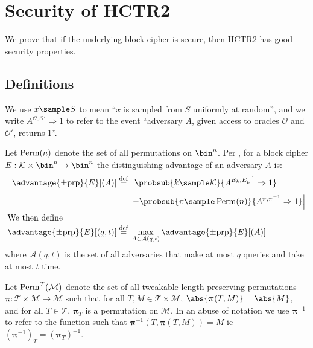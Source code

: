 \documentclass[hctr.tex]{subfiles}
\begin{document}
\section{Security of HCTR2}\label{security}
We prove that if the underlying block cipher is secure,
then HCTR2 has good security properties.
\subsection{Definitions}
We use \(x \sample S\) to mean ``\(x\) is sampled from \(S\)
uniformly at random'', and we write
\(A^{\mathcal{O}, \mathcal{O}'}\Rightarrow 1\) to refer
to the event ``adversary \(A\),
given access to oracles \(\mathcal{O}\) and \(\mathcal{O}'\),
returns 1''.

Let $\operatorname{Perm}(n)$ denote the set of all permutations on \(\bin^n\).
Per \cite{concrete}, for a block cipher 
\(E: \mathcal{K} \times \bin^n \rightarrow \bin^n\)
the distinguishing advantage of an adversary \(A\) is:
%
\begin{align*}
    \advantage{\pm \mathrm{prp}}{E}[(A)] \defeq
    {}&\left\lvert\probsub{k \sample \mathcal{K}}{A^{E_k,E_k^{-1}}\Rightarrow 1}\right.
    \\
    {}&\left. - \probsub{\pi \sample \Perm(n)}{A^{\pi,\pi^{-1}}\Rightarrow 1}\right\rvert
    \\
    \intertext{We then define}
    \advantage{\pm \mathrm{prp}}{E}[(q, t)] \defeq
    {}&\max_{A \in \mathcal{A}(q, t)} \advantage{\pm \mathrm{prp}}{E}[(A)]
\end{align*}
where $\mathcal{A}(q, t)$
is the set of all adversaries that make at most $q$ queries and take at most $t$ time.

Let $\operatorname{Perm}^\mathcal{T}(\mathcal{M})$
denote the set of all
tweakable length-preserving permutations
$\bm{\pi} : \mathcal{T} \times \mathcal{M} \rightarrow \mathcal{M}$
such that for all $T, M \in \mathcal{T} \times \mathcal{M}$,
$\abs{\bm{\pi}(T, M)} = \abs{M}$, and
for all $T \in \mathcal{T}$, $\bm{\pi}_{T}$ is a permutation on \(\mathcal{M}\).
In an abuse of notation
we use $\bm{\pi}^{-1}$ to refer to the function
such that $\bm{\pi}^{-1}(T, \bm{\pi}(T, M)) = M$ ie $(\bm{\pi}^{-1})_T = (\bm{\pi}_T)^{-1}$.
\end{document}
